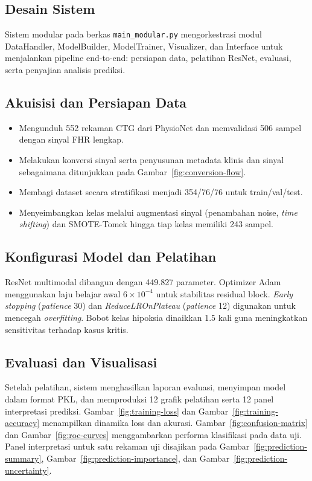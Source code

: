 \documentclass[12pt,a4paper]{article}
\begin{document}
\subsection{Desain Sistem}
Sistem modular pada berkas \texttt{main\_modular.py} mengorkestrasi modul DataHandler, ModelBuilder, ModelTrainer, Visualizer, dan Interface untuk menjalankan pipeline end-to-end: persiapan data, pelatihan ResNet, evaluasi, serta penyajian analisis prediksi.

\subsection{Akuisisi dan Persiapan Data}
\begin{itemize}
    \item Mengunduh 552 rekaman CTG dari PhysioNet dan memvalidasi 506 sampel dengan sinyal FHR lengkap.
    \item Melakukan konversi sinyal serta penyusunan metadata klinis dan sinyal sebagaimana ditunjukkan pada Gambar~\ref{fig:conversion-flow}.
    \item Membagi dataset secara stratifikasi menjadi 354/76/76 untuk train/val/test.
    \item Menyeimbangkan kelas melalui augmentasi sinyal (penambahan noise, \textit{time shifting}) dan SMOTE-Tomek hingga tiap kelas memiliki 243 sampel.
\end{itemize}

\subsection{Konfigurasi Model dan Pelatihan}
ResNet multimodal dibangun dengan 449.827 parameter. Optimizer Adam menggunakan laju belajar awal \(6 \times 10^{-4}\) untuk stabilitas residual block. \textit{Early stopping} (\textit{patience} 30) dan \textit{ReduceLROnPlateau} (\textit{patience} 12) digunakan untuk mencegah \textit{overfitting}. Bobot kelas hipoksia dinaikkan 1.5 kali guna meningkatkan sensitivitas terhadap kasus kritis.

\subsection{Evaluasi dan Visualisasi}
Setelah pelatihan, sistem menghasilkan laporan evaluasi, menyimpan model dalam format PKL, dan memproduksi 12 grafik pelatihan serta 12 panel interpretasi prediksi. Gambar~\ref{fig:training-loss} dan Gambar~\ref{fig:training-accuracy} menampilkan dinamika loss dan akurasi. Gambar~\ref{fig:confusion-matrix} dan Gambar~\ref{fig:roc-curves} menggambarkan performa klasifikasi pada data uji. Panel interpretasi untuk satu rekaman uji disajikan pada Gambar~\ref{fig:prediction-summary}, Gambar~\ref{fig:prediction-importance}, dan Gambar~\ref{fig:prediction-uncertainty}.
\end{document}
